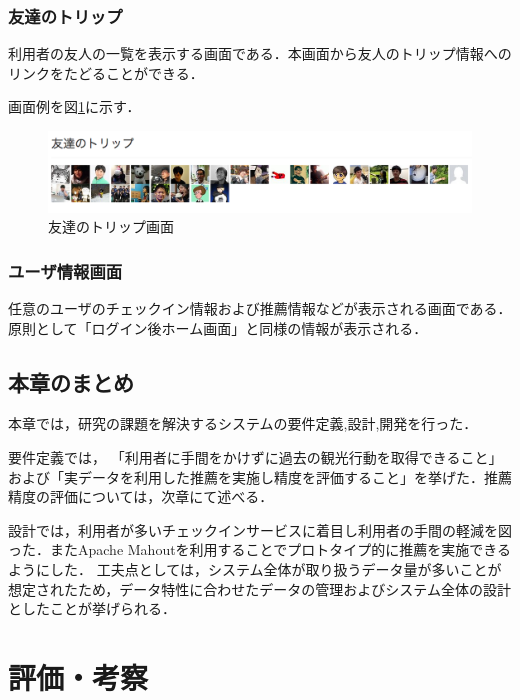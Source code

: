 \documentclass{jsarticle}
\begin{document}
\subsubsection{友達のトリップ}

利用者の友人の一覧を表示する画面である．本画面から友人のトリップ情報へのリンクをたどることができる．

画面例を図\ref{cheekitrip_friends}に示す．

\begin{figure}[!ht]
\begin{center}
\includegraphics[width=12.0cm]{./image/cheekitrip_friends.png}
\caption{友達のトリップ画面}
\label{cheekitrip_friends}
\end{center}
\end{figure}

\subsubsection{ユーザ情報画面}

任意のユーザのチェックイン情報および推薦情報などが表示される画面である．原則として「ログイン後ホーム画面」と同様の情報が表示される．

\subsection{本章のまとめ}

本章では，研究の課題を解決するシステムの要件定義,設計,開発を行った．

要件定義では， 「利用者に手間をかけずに過去の観光行動を取得できること」および「実データを利用した推薦を実施し精度を評価すること」を挙げた．推薦精度の評価については，次章にて述べる．

設計では，利用者が多いチェックインサービスに着目し利用者の手間の軽減を図った．またApache Mahoutを利用することでプロトタイプ的に推薦を実施できるようにした． 工夫点としては，システム全体が取り扱うデータ量が多いことが想定されたため，データ特性に合わせたデータの管理およびシステム全体の設計としたことが挙げられる．


\newpage

\section{評価・考察}
\end{document}
